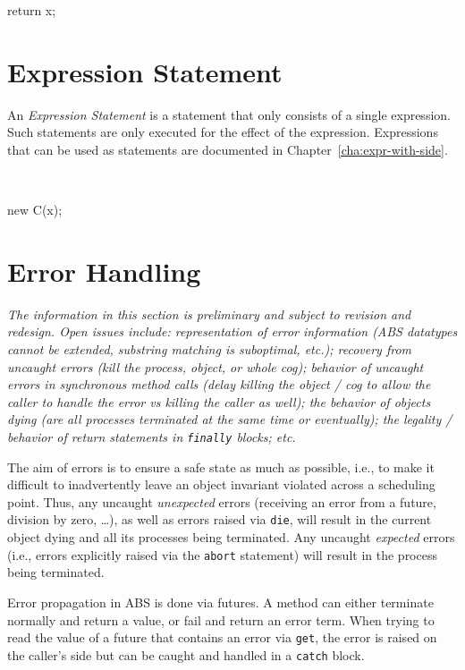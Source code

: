 \begin{absexample}
return x;
\end{absexample}

\section{Expression Statement}
An \emph{Expression Statement} is a statement that only consists of a
single expression. Such statements are only executed for the effect of
the expression.  Expressions that can be used as statements are
documented in Chapter~\ref{cha:expr-with-side}.

\begin{abssyntax}
  {}\ \TRS{;}
\end{abssyntax}

\begin{absexample}
new C(x);
\end{absexample}

\section{Error Handling}
\label{sec:error-handling}

\emph{The information in this section is preliminary and subject to
  revision and redesign.  Open issues include: representation of error
  information (ABS datatypes cannot be extended, substring matching is
  suboptimal, etc.); recovery from uncaught errors (kill the process,
  object, or whole cog); behavior of uncaught errors in synchronous
  method calls (delay killing the object / cog to allow the caller to
  handle the error vs killing the caller as well); the behavior of
  objects dying (are all processes terminated at the same time or
  eventually); the legality / behavior of return statements in
  \texttt{finally} blocks; etc.}

The aim of errors is to ensure a safe state as much as possible, i.e.,
to make it difficult to inadvertently leave an object invariant violated
across a scheduling point.  Thus, any uncaught \emph{unexpected} errors
(receiving an error from a future, division by zero, \dots), as well as
errors raised via \texttt{die}, will result in the current object dying
and all its processes being terminated.  Any uncaught \emph{expected}
errors (i.e., errors explicitly raised via the \texttt{abort} statement)
will result in the process being terminated.

Error propagation in ABS is done via futures.  A method can either
terminate normally and return a value, or fail and return an error term.
When trying to read the value of a future that contains an error via
\texttt{get}, the error is raised on the caller's side but can be caught
and handled in a \texttt{catch} block.



